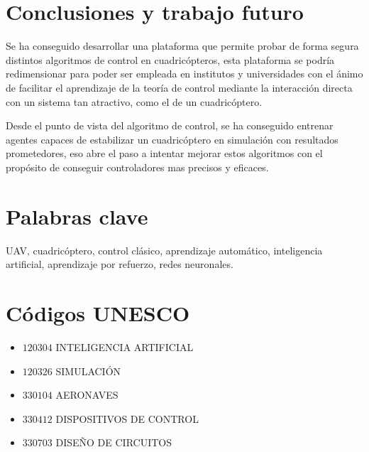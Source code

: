 \section*{Conclusiones y trabajo futuro}
Se ha conseguido desarrollar una plataforma que permite probar de forma segura distintos algoritmos de control en cuadricópteros, esta plataforma se podría redimensionar para poder ser empleada en institutos y universidades con el ánimo de facilitar el aprendizaje de la teoría de control mediante la interacción directa con un sistema tan atractivo, como el de un cuadricóptero.

Desde el punto de vista del algoritmo de control, se ha conseguido entrenar agentes capaces de estabilizar un cuadricóptero en simulación con resultados prometedores, eso abre el paso a intentar mejorar estos algoritmos con el propósito de conseguir controladores mas precisos y eficaces.

\section*{Palabras clave}
UAV, cuadricóptero, control clásico, aprendizaje automático, inteligencia artificial, aprendizaje por refuerzo, redes neuronales.
\section*{Códigos UNESCO}
\begin{itemize}
	\item[] $120304$ \quad INTELIGENCIA ARTIFICIAL
	\item[] $120326$ \quad SIMULACIÓN
	\item[] $330104$ \quad AERONAVES
	\item[] $330412$ \quad DISPOSITIVOS DE CONTROL
	\item[] $330703$ \quad DISEÑO DE CIRCUITOS 


\end{itemize}
\newpage
\newpage